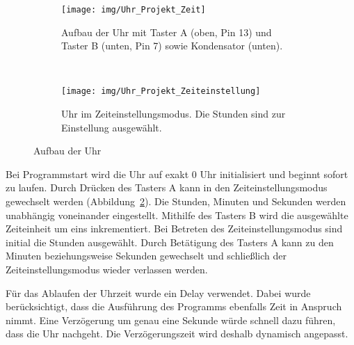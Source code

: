 \begin{figure}[p]
    \centering
    \begin{subfigure}[b]{0.6\linewidth}
        \centering
        \texttt{[image: img/Uhr\_Projekt\_Zeit]}
        \caption{Aufbau der Uhr mit Taster A (oben, Pin 13) und Taster B (unten, Pin 7) sowie Kondensator (unten).}\label{fig:zeit}
    \end{subfigure}\enspace%
    \\
    \begin{subfigure}[b]{0.6\linewidth}
        \centering
        \texttt{[image: img/Uhr\_Projekt\_Zeiteinstellung]}
        \caption{Uhr im Zeiteinstellungsmodus. Die Stunden sind zur Einstellung ausgewählt.}\label{fig:zeiteinstell}
    \end{subfigure}
    \caption{Aufbau der Uhr}\label{fig:uhr}
\end{figure}

Bei Programmstart wird die Uhr auf exakt 0 Uhr initialisiert und beginnt sofort zu laufen. Durch Drücken des Tasters A kann in den Zeiteinstellungsmodus gewechselt werden  (Abbildung~\ref{fig:zeiteinstell}). Die Stunden, Minuten und Sekunden werden unabhängig voneinander eingestellt. Mithilfe des Tasters B wird die ausgewählte Zeiteinheit um eins inkrementiert. Bei Betreten des Zeiteinstellungsmodus sind initial die Stunden ausgewählt. Durch Betätigung des Tasters A kann zu den Minuten beziehungsweise Sekunden gewechselt und schließlich der Zeiteinstellungsmodus wieder verlassen werden.

Für das Ablaufen der Uhrzeit wurde ein Delay verwendet. Dabei wurde berücksichtigt, dass die Ausführung des Programms ebenfalls Zeit in Anspruch nimmt. Eine Verzögerung um genau eine Sekunde würde schnell dazu führen, dass die Uhr nachgeht. Die Verzögerungszeit wird deshalb dynamisch angepasst.

